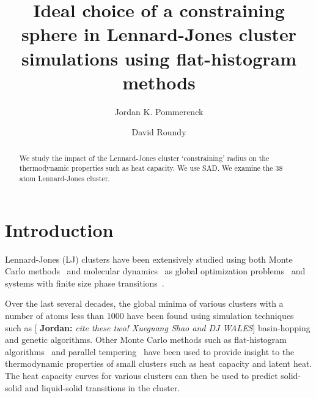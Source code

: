 \documentclass[letterpaper,twocolumn,amsmath,amssymb,pre,aps,10pt]{revtex4-1}
\newcommand{\blue}[1]{{\bf \color{blue} #1}}
\newcommand{\jpsays}[1]{{\color{red} [\blue{Jordan:} \emph{#1}]}}
\begin{document}
\title{Ideal choice of a constraining sphere in Lennard-Jones cluster
simulations using flat-histogram methods
}

\author{Jordan K. Pommerenck} \author{David Roundy}

\begin{abstract}
  We study the impact of the Lennard-Jones cluster `constraining' radius on 
  the thermodynamic properties such as heat capacity. We use SAD. We examine
  the 38 atom Lennard-Jones cluster.
\end{abstract}

\maketitle

\section{Introduction}


Lennard-Jones (LJ) clusters have been extensively studied using both Monte Carlo methods~\cite{frantsuzov2005size, mandelshtam2006structural,
mandelshtam2006multiple} and molecular dynamics~\cite{honeycutt1987molecular, calvo1995configurational, calvo2000phase} as global optimization
problems~\cite{wales1997global, wales1998global, wales1999global, doye1999double} and systems with finite size phase
transitions~\cite{neirotti2000phase, sabo2005pressure, sehgal2014phase}.

Over the last several decades, the global minima of various clusters with a number of atoms less than 1000 have been
found using simulation techniques such as \jpsays{cite these two!  Xueguang Shao and DJ WALES} basin-hopping and genetic algorithms.
Other Monte Carlo methods such as flat-histogram algorithms~\cite{?} and parallel tempering~\cite{?} have been used to provide insight to 
the thermodynamic properties of small clusters such as heat capacity and latent heat. The heat capacity curves for various clusters can
then be used to predict solid-solid and liquid-solid transitions in the cluster. 

\end{document}
